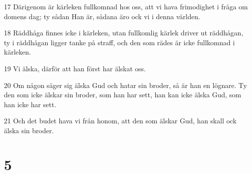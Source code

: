 \par 17 Därigenom är kärleken fullkomnad hos oss, att vi hava frimodighet i fråga om domens dag; ty sådan Han är, sådana äro ock vi i denna världen.
\par 18 Räddhåga finnes icke i kärleken, utan fullkomlig kärlek driver ut räddhågan, ty i räddhågan ligger tanke på straff, och den som rädes är icke fullkomnad i kärleken.
\par 19 Vi älska, därför att han först har älskat oss.
\par 20 Om någon säger sig älska Gud och hatar sin broder, så är han en lögnare. Ty den som icke älskar sin broder, som han har sett, han kan icke älska Gud, som han icke har sett.
\par 21 Och det budet hava vi från honom, att den som älskar Gud, han skall ock älska sin broder.

\chapter{5}

